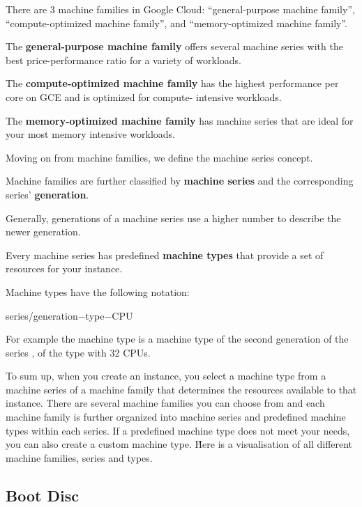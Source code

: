 There are 3 machine families in Google Cloud: ``general-purpose machine family'', ``compute-optimized machine family'',
and ``memory-optimized machine family''.

The \textbf{general-purpose machine family} offers several machine series with the best price-performance ratio for a
variety of workloads.
\ed

The \textbf{compute-optimized machine family} has the highest performance per core on GCE and is optimized for compute-
intensive workloads.
\ed

The \textbf{memory-optimized machine family} has machine series that are ideal for your most memory intensive workloads.
\ed

Moving on from machine families, we define the machine series concept.

Machine families are further classified by \textbf{machine series} and the corresponding series' \textbf{generation}.
\ed

Generally, generations of a machine series use a higher number to describe the newer generation.

Every machine series has predefined \textbf{machine types} that provide a set of resources for your instance.
\ed

Machine types have the following notation:
\begin{bash}
series/generation$-$type$-$CPU
\end{bash}

\be
For example the machine type  is a machine type of the second generation of the series
, of the type  with 32 CPUs.
\ee

To sum up, when you create an instance, you select a machine type from a machine series of a machine family that
determines the resources available to that instance. There are several machine families you can choose from and each
machine family is further organized into machine series and predefined machine types within each series. If a
predefined machine type does not meet your needs, you can also create a custom machine type. \v

Here is a visualisation of all different machine families, series and types.


\subsection{Boot Disc}

